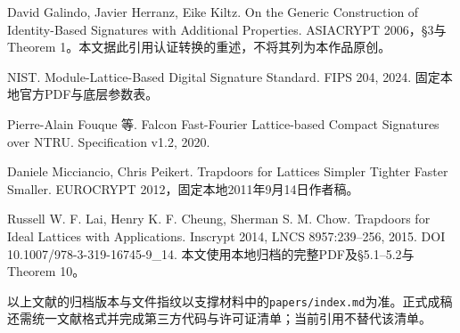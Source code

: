 \documentclass[UTF8,a4paper,12pt,oneside,openany,fontset=fandol]{ctexrep}
\begin{document}
\begingroup\small\noindent [11] David Galindo, Javier Herranz, Eike Kiltz. On the Generic Construction of Identity-Based Signatures with Additional Properties. ASIACRYPT 2006，\S{}3与Theorem 1。本文据此引用认证转换的重述，不将其列为本作品原创。\par\endgroup

\begingroup\small\noindent [12] NIST. Module-Lattice-Based Digital Signature Standard. FIPS 204, 2024. 固定本地官方PDF与底层参数表。\par\endgroup

\begingroup\small\noindent [13] Pierre-Alain Fouque 等. Falcon Fast-Fourier Lattice-based Compact Signatures over NTRU. Specification v1.2, 2020.\par\endgroup

\begingroup\small\noindent [14] Daniele Micciancio, Chris Peikert. Trapdoors for Lattices Simpler Tighter Faster Smaller. EUROCRYPT 2012，固定本地2011年9月14日作者稿。\par\endgroup

\begingroup\small\noindent [15] Russell W. F. Lai, Henry K. F. Cheung, Sherman S. M. Chow. Trapdoors for Ideal Lattices with Applications. Inscrypt 2014, LNCS 8957:239--256, 2015. DOI 10.1007/978-3-319-16745-9\_14. 本文使用本地归档的完整PDF及\S{}5.1--5.2与Theorem 10。\par\endgroup

以上文献的归档版本与文件指纹以支撑材料中的\nolinkurl{papers/index.md}为准。正式成稿还需统一文献格式并完成第三方代码与许可证清单；当前引用不替代该清单。
\par\endgroup
\end{document}
